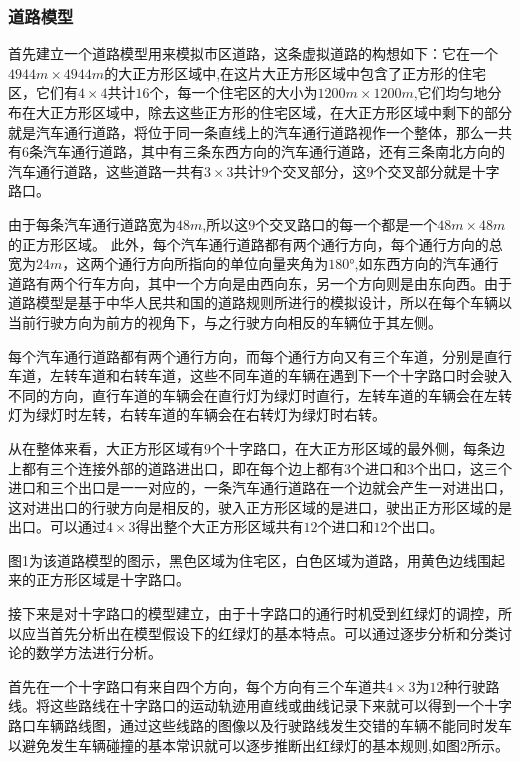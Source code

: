 \documentclass[a4paper,12pt]{article}
\numberwithin{equation}{section}
\begin{document}
	\subsubsection{道路模型}
	首先建立一个道路模型用来模拟市区道路，这条虚拟道路的构想如下：它在一个$4944m\times 4944m$的大正方形区域中,在这片大正方形区域中包含了正方形的住宅区，它们有$4\times 4$共计$16$个，每一个住宅区的大小为$1200m\times 1200m$,它们均匀地分布在大正方形区域中，除去这些正方形的住宅区域，在大正方形区域中剩下的部分就是汽车通行道路，将位于同一条直线上的汽车通行道路视作一个整体，那么一共有$6$条汽车通行道路，其中有三条东西方向的汽车通行道路，还有三条南北方向的汽车通行道路，这些道路一共有$3\times 3$共计$9$个交叉部分，这$9$个交叉部分就是十字路口。\par
	由于每条汽车通行道路宽为$48m$,所以这$9$个交叉路口的每一个都是一个$48m\times 48m$的正方形区域。
	此外，每个汽车通行道路都有两个通行方向，每个通行方向的总宽为$24m$，这两个通行方向所指向的单位向量夹角为$180°$,如东西方向的汽车通行道路有两个行车方向，其中一个方向是由西向东，另一个方向则是由东向西。由于道路模型是基于中华人民共和国的道路规则所进行的模拟设计，所以在每个车辆以当前行驶方向为前方的视角下，与之行驶方向相反的车辆位于其左侧。\par
	每个汽车通行道路都有两个通行方向，而每个通行方向又有三个车道，分别是直行车道，左转车道和右转车道，这些不同车道的车辆在遇到下一个十字路口时会驶入不同的方向，直行车道的车辆会在直行灯为绿灯时直行，左转车道的车辆会在左转灯为绿灯时左转，右转车道的车辆会在右转灯为绿灯时右转。\par
	从在整体来看，大正方形区域有$9$个十字路口，在大正方形区域的最外侧，每条边上都有三个连接外部的道路进出口，即在每个边上都有$3$个进口和$3$个出口，这三个进口和三个出口是一一对应的，一条汽车通行道路在一个边就会产生一对进出口，这对进出口的行驶方向是相反的，驶入正方形区域的是进口，驶出正方形区域的是出口。可以通过$4\times 3$得出整个大正方形区域共有$12$个进口和$12$个出口。\par
	图1为该道路模型的图示，黑色区域为住宅区，白色区域为道路，用黄色边线围起来的正方形区域是十字路口。\par
	接下来是对十字路口的模型建立，由于十字路口的通行时机受到红绿灯的调控，所以应当首先分析出在模型假设下的红绿灯的基本特点。可以通过逐步分析和分类讨论的数学方法进行分析。\par 
	首先在一个十字路口有来自四个方向，每个方向有三个车道共$4\times 3$为$12$种行驶路线。将这些路线在十字路口的运动轨迹用直线或曲线记录下来就可以得到一个十字路口车辆路线图，通过这些线路的图像以及行驶路线发生交错的车辆不能同时发车以避免发生车辆碰撞的基本常识就可以逐步推断出红绿灯的基本规则,如图2所示。\par
\end{document}
